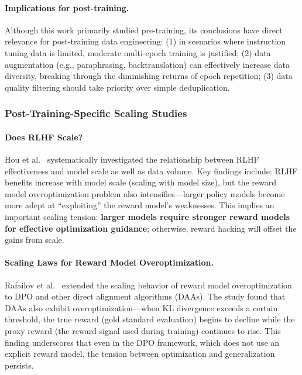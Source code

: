 \paragraph{Implications for post-training.}
Although this work primarily studied pre-training,
its conclusions have direct relevance for post-training data engineering:
(1) in scenarios where instruction tuning data is limited, moderate multi-epoch training is justified;
(2) data augmentation (e.g., paraphrasing, backtranslation) can effectively increase data diversity,
breaking through the diminishing returns of epoch repetition;
(3) data quality filtering should take priority over simple deduplication.

\subsubsection{Post-Training-Specific Scaling Studies}
\label{sec:t7-scaling-pt}

\paragraph{Does RLHF Scale?}
Hou et al.\ \cite{hou2024doesrlhfscale} systematically investigated
the relationship between RLHF effectiveness and model scale as well as data volume.
Key findings include:
RLHF benefits increase with model scale (scaling with model size),
but the reward model overoptimization problem also intensifies---larger policy models become more adept at ``exploiting'' the reward model's weaknesses.
This implies an important scaling tension:
\textbf{larger models require stronger reward models for effective optimization guidance};
otherwise, reward hacking will offset the gains from scale.

\paragraph{Scaling Laws for Reward Model Overoptimization.}
Rafailov et al.\ \cite{rafailov2024scaling} extended the scaling behavior of reward model overoptimization
to DPO and other direct alignment algorithms (DAAs).
The study found that DAAs also exhibit overoptimization---when KL divergence exceeds a certain threshold,
the true reward (gold standard evaluation) begins to decline
while the proxy reward (the reward signal used during training) continues to rise.
This finding underscores that even in the DPO framework, which does not use an explicit reward model,
the tension between optimization and generalization persists.

